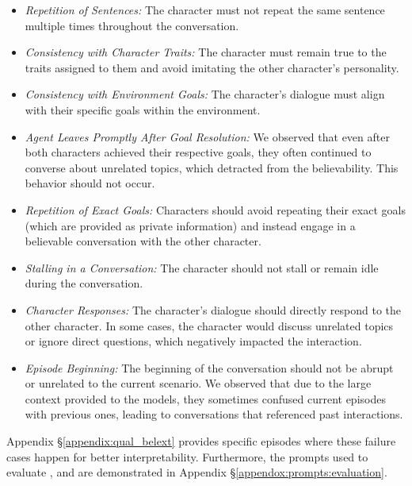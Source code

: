 \begin{itemize}
    \item \textit{Repetition of Sentences:} The character must not repeat the same sentence multiple times throughout the conversation.
    
    \item \textit{Consistency with Character Traits:} The character must remain true to the traits assigned to them and avoid imitating the other character's personality.
    
    \item \textit{Consistency with Environment Goals:} The character’s dialogue must align with their specific goals within the environment.
    
    \item \textit{Agent Leaves Promptly After Goal Resolution:} We observed that even after both characters achieved their respective goals, they often continued to converse about unrelated topics, which detracted from the believability. This behavior should not occur.
    
    \item \textit{Repetition of Exact Goals:} Characters should avoid repeating their exact goals (which are provided as private information) and instead engage in a believable conversation with the other character.
    
    \item \textit{Stalling in a Conversation:} The character should not stall or remain idle during the conversation.
    
    \item \textit{Character Responses:} The character’s dialogue should directly respond to the other character. In some cases, the character would discuss unrelated topics or ignore direct questions, which negatively impacted the interaction.
    
    \item \textit{Episode Beginning:} The beginning of the conversation should not be abrupt or unrelated to the current scenario. We observed that due to the large context provided to the models, they sometimes confused current episodes with previous ones, leading to conversations that referenced past interactions.
\end{itemize}

Appendix \S \ref{appendix:qual_belext} provides specific episodes where these failure cases happen for better interpretability. Furthermore, the prompts used to evaluate \believability, \goalcompletion and \believabilityextended are demonstrated in Appendix \S \ref{appendox:prompts:evaluation}. 

